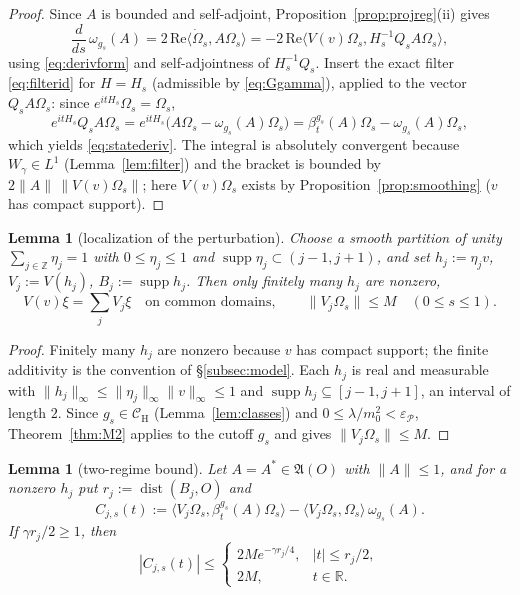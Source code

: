 \documentclass[11pt,a4paper]{article}
\theoremstyle{plain}
\newtheorem{lemma}[theorem]{Lemma}
\theoremstyle{definition}
\theoremstyle{plain}
\theoremstyle{definition}
\newcommand{\R}{\mathbb{R}}
\newcommand{\Z}{\mathbb{Z}}
\newcommand{\A}{\mathfrak{A}}
\newcommand{\CH}{\mathcal{C}_{\mathrm H}}
\newcommand{\Om}{\Omega}
\newcommand{\ip}[2]{\langle #1,#2\rangle}
\DeclareMathOperator{\supp}{supp}
\DeclareMathOperator{\dist}{dist}
\begin{document}
\begin{proof}
Since $A$ is bounded and self-adjoint, Proposition~\ref{prop:projreg}(ii) gives
\[
 \frac d{ds}\,\omega_{g_s}(A)
 =2\,\mathrm{Re}\ip{\dot\Om_s}{A\Om_s}
 =-2\,\mathrm{Re}\ip{V(v)\Om_s}{H_s^{-1}Q_sA\Om_s},
\]
using \eqref{eq:derivform} and self-adjointness of $H_s^{-1}Q_s$. Insert the exact filter
\eqref{eq:filterid} for $H=H_s$ (admissible by \eqref{eq:Ggamma}), applied to the vector
$Q_sA\Om_s$: since $e^{itH_s}\Om_s=\Om_s$,
\[
 e^{itH_s}Q_sA\Om_s
 =e^{itH_s}\bigl(A\Om_s-\omega_{g_s}(A)\Om_s\bigr)
 =\beta^{g_s}_t(A)\Om_s-\omega_{g_s}(A)\Om_s ,
\]
which yields \eqref{eq:statederiv}. The integral is absolutely convergent because
$W_\gamma\in L^1$ (Lemma~\ref{lem:filter}) and the bracket is bounded by
$2\|A\|\,\|V(v)\Om_s\|$; here $V(v)\Om_s$ exists by Proposition~\ref{prop:smoothing}
($v$ has compact support).
\end{proof}

\begin{lemma}[localization of the perturbation]\label{lem:localize}
Choose a smooth partition of unity $\sum_{j\in\Z}\eta_j=1$ with $0\le\eta_j\le1$ and
$\supp\eta_j\subset(j-1,j+1)$, and set $h_j:=\eta_jv$, $V_j:=V(h_j)$, $B_j:=\supp h_j$.
Then only finitely many $h_j$ are nonzero,
\begin{equation}
 V(v)\xi=\sum_jV_j\xi
 \quad\text{on common domains},\qquad
 \|V_j\Om_s\|\le M\quad(0\le s\le1).
 \label{eq:localize}
\end{equation}
\end{lemma}

\begin{proof}
Finitely many $h_j$ are nonzero because $v$ has compact support; the finite additivity is
the convention of \S\ref{subsec:model}. Each $h_j$ is real and measurable with
$\|h_j\|_\infty\le\|\eta_j\|_\infty\|v\|_\infty\le1$ and
$\supp h_j\subseteq[j-1,j+1]$, an interval of length $2$. Since $g_s\in\CH$
(Lemma~\ref{lem:classes}) and $0\le\lambda/m_0^2<\varepsilon_{\mathscr P}$,
Theorem~\ref{thm:M2} applies to the cutoff $g_s$ and gives $\|V_j\Om_s\|\le M$.
\end{proof}

\begin{lemma}[two-regime bound]\label{lem:tworegime}
Let $A=A^*\in\A(O)$ with $\|A\|\le1$, and for a nonzero $h_j$ put
$r_j:=\dist(B_j,O)$ and
\[
 C_{j,s}(t):=\ip{V_j\Om_s}{\beta^{g_s}_t(A)\Om_s}
 -\ip{V_j\Om_s}{\Om_s}\,\omega_{g_s}(A) .
\]
If $\gamma r_j/2\ge1$, then
\begin{equation}
 |C_{j,s}(t)|\le
 \begin{cases}
 2Me^{-\gamma r_j/4},&|t|\le r_j/2,\\[2pt]
 2M,&t\in\R .
 \end{cases}
 \label{eq:tworegime}
\end{equation}
\end{lemma}
\end{document}
